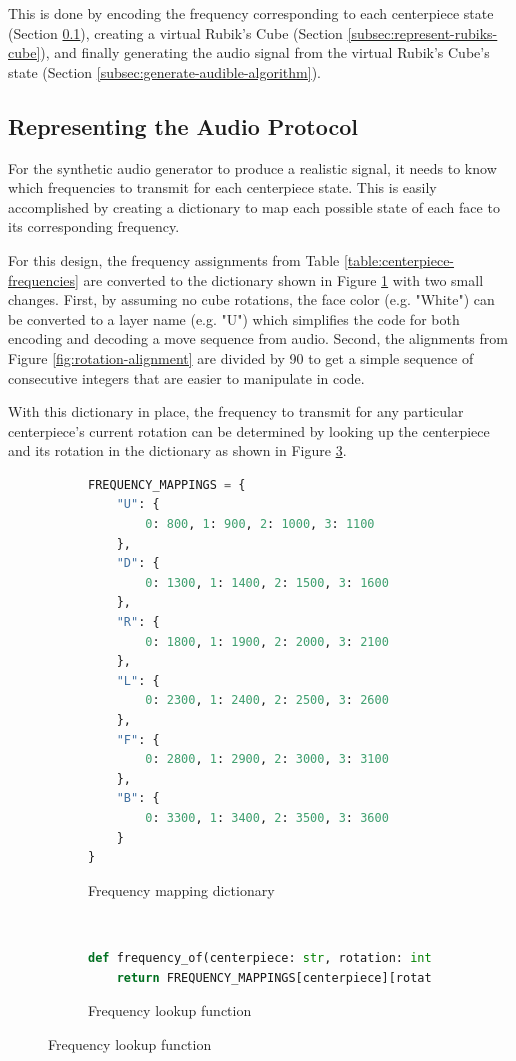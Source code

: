 This is done by encoding the frequency corresponding to each centerpiece state (Section \ref{subsec:represent-audio-protocol}), creating a virtual Rubik's Cube (Section \ref{subsec:represent-rubiks-cube}), and finally generating the audio signal from the virtual Rubik's Cube's state (Section \ref{subsec:generate-audible-algorithm}).
\newpage
\subsection{Representing the Audio Protocol}
\label{subsec:represent-audio-protocol}
For the synthetic audio generator to produce a realistic signal, it needs to know which frequencies to transmit for each centerpiece state. 
This is easily accomplished by creating a dictionary to map each possible state of each face to its corresponding frequency.

For this design, the frequency assignments from Table \ref{table:centerpiece-frequencies} are converted to the dictionary shown in Figure \ref{fig:code-freq-mapping-dict} with two small changes.
First, by assuming no cube rotations, the face color (e.g. "White") can be converted to a layer name (e.g. "U") which simplifies the code for both encoding and decoding a move sequence from audio.
Second, the alignments from Figure \ref{fig:rotation-alignment} are divided by 90 to get a simple sequence of consecutive integers that are easier to manipulate in code.

With this dictionary in place, the frequency to transmit for any particular centerpiece's current rotation can be determined by looking up the centerpiece and its rotation in the dictionary as shown in Figure \ref{fig:code-frequency-of}.

\begin{figure}[h]
\caption{Centerpiece State to Frequency Mapping}
\begin{subfigure}{\textwidth}
\caption{Frequency mapping dictionary}
\label{fig:code-freq-mapping-dict}
\begin{lstlisting}[language=Python]
FREQUENCY_MAPPINGS = {
    "U": {
        0: 800, 1: 900, 2: 1000, 3: 1100
    },
    "D": {
        0: 1300, 1: 1400, 2: 1500, 3: 1600
    },
    "R": {
        0: 1800, 1: 1900, 2: 2000, 3: 2100
    },
    "L": {
        0: 2300, 1: 2400, 2: 2500, 3: 2600
    },
    "F": {
        0: 2800, 1: 2900, 2: 3000, 3: 3100
    },
    "B": {
        0: 3300, 1: 3400, 2: 3500, 3: 3600
    }
}
\end{lstlisting}
\end{subfigure}\\
\begin{subfigure}{\textwidth}
\caption{Frequency lookup function}
\label{fig:code-frequency-of}
\begin{lstlisting}[language=Python, firstnumber=last]
def frequency_of(centerpiece: str, rotation: int) -> float:
    return FREQUENCY_MAPPINGS[centerpiece][rotation]
\end{lstlisting}
\end{subfigure}
\end{figure}


